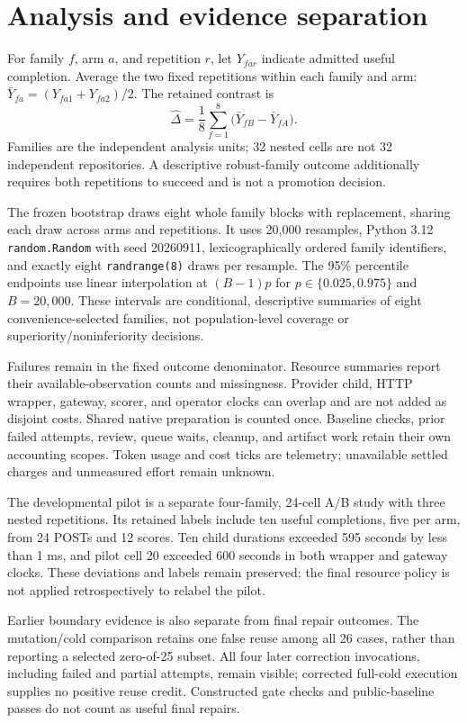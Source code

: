 \section{Analysis and evidence separation}
\label{sec:analysis-method}

For family $f$, arm $a$, and repetition $r$, let $Y_{far}$ indicate admitted
useful completion. Average the two fixed repetitions within each family and arm:
$\bar Y_{fa}=(Y_{fa1}+Y_{fa2})/2$. The retained contrast is
\[
  \widehat{\Delta}=\frac{1}{8}\sum_{f=1}^{8}
                   \bigl(\bar Y_{fB}-\bar Y_{fA}\bigr).
\]
Families are the independent analysis units; 32 nested cells are not 32
independent repositories. A descriptive robust-family outcome additionally
requires both repetitions to succeed and is not a promotion decision.

The frozen bootstrap draws eight whole family blocks with replacement, sharing
each draw across arms and repetitions. It uses 20,000 resamples, Python 3.12
\texttt{random.Random} with seed 20260911, lexicographically ordered family
identifiers, and exactly eight \texttt{randrange(8)} draws per resample.
The 95\% percentile endpoints use linear interpolation at $(B-1)p$ for
$p\in\{0.025,0.975\}$ and $B=20{,}000$. These intervals are conditional,
descriptive summaries of eight convenience-selected families, not
population-level coverage or superiority/noninferiority decisions.

Failures remain in the fixed outcome denominator. Resource summaries report
their available-observation counts and missingness. Provider child, HTTP
wrapper, gateway, scorer, and operator clocks can overlap and are not added
as disjoint costs. Shared native preparation is counted once. Baseline checks,
prior failed attempts, review, queue waits, cleanup, and artifact work retain
their own accounting scopes. Token usage and cost ticks are telemetry;
unavailable settled charges and unmeasured effort remain unknown.

The developmental pilot is a separate four-family, 24-cell A/B study with
three nested repetitions. Its retained labels include ten useful completions,
five per arm, from 24 POSTs and 12 scores. Ten child durations exceeded 595
seconds by less than 1 ms, and pilot cell 20 exceeded 600 seconds in both
wrapper and gateway clocks. These deviations and labels remain preserved;
the final resource policy is not applied retrospectively to relabel the pilot.

Earlier boundary evidence is also separate from final repair outcomes.
The mutation/cold comparison retains one false reuse among all 26 cases,
rather than reporting a selected zero-of-25 subset. All four later correction
invocations, including failed and partial attempts, remain visible; corrected
full-cold execution supplies no positive reuse credit. Constructed gate checks
and public-baseline passes do not count as useful final repairs.


